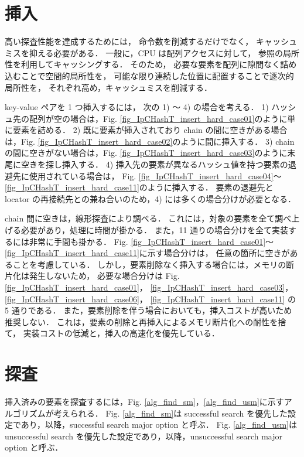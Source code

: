 \section{挿入}

高い探査性能を達成するためには，
命令数を削減するだけでなく，
キャッシュミスを抑える必要がある．
一般に，CPU は配列アクセスに対して，
参照の局所性を利用してキャッシングする．
そのため，
必要な要素を配列に隙間なく詰め込むことで空間的局所性を，
可能な限り連続した位置に配置することで逐次的局所性を，
それぞれ高め，キャッシュミスを削減する．

key-value ペアを 1 つ挿入するには，
次の 1) 〜 4) の場合を考える．
1) ハッシュ先の配列が空の場合は，Fig. \ref{fig_IpCHashT_insert_hard_case01}のように単に要素を詰める．
2) 既に要素が挿入されており chain の間に空きがある場合は，Fig. \ref{fig_IpCHashT_insert_hard_case02}のように間に挿入する．
3) chain の間に空きがない場合は，Fig. \ref{fig_IpCHashT_insert_hard_case03}のように末尾に空きを探し挿入する．
4) 挿入先の要素が異なるハッシュ値を持つ要素の退避先に使用されている場合は，
Fig. \ref{fig_IpCHashT_insert_hard_case04}〜\ref{fig_IpCHashT_insert_hard_case11}のように挿入する．
要素の退避先と locator の再接続先との兼ね合いのため，4) には多くの場合分けが必要となる．

chain 間に空きは，線形探査により調べる．
これには，対象の要素を全て調べ上げる必要があり，処理に時間が掛かる．
また，11 通りの場合分けを全て実装するには非常に手間も掛かる．
Fig. \ref{fig_IpCHashT_insert_hard_case01}〜\ref{fig_IpCHashT_insert_hard_case11}に示す場合分けは，
任意の箇所に空きがあることを考慮している．
しかし，要素削除なく挿入する場合には，メモリの断片化は発生しないため，
必要な場合分けは
Fig. \ref{fig_IpCHashT_insert_hard_case01}，
\ref{fig_IpCHashT_insert_hard_case03}，
\ref{fig_IpCHashT_insert_hard_case06}，
\ref{fig_IpCHashT_insert_hard_case11}
の 5 通りである．
また，要素削除を伴う場合においても，挿入コストが高いため推奨しない．
これは，要素の削除と再挿入によるメモリ断片化への耐性を捨て，
実装コストの低減と，挿入の高速化を優先している．

\section{探査}

挿入済みの要素を探査するには，Fig. \ref{alg_find_sm}，\ref{alg_find_usm}に示すアルゴリズムが考えられる．
Fig. \ref{alg_find_sm}は successful search を優先した設定であり，以降，successful search major option と呼ぶ．
Fig. \ref{alg_find_usm}は unsuccessful search を優先した設定であり，以降，unsuccessful search major option と呼ぶ．


